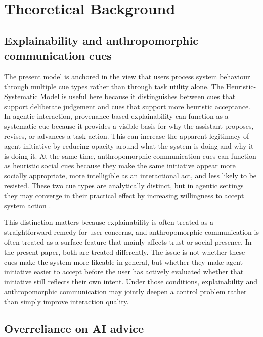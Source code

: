 \documentclass[sigconf,review,anonymous]{acmart}
\begin{document}
\section{Theoretical Background}

\subsection{Explainability and anthropomorphic communication cues}

The present model is anchored in the view that users process system behaviour through multiple cue types rather than through task utility alone. The Heuristic-Systematic Model is useful here because it distinguishes between cues that support deliberate judgement and cues that support more heuristic acceptance. In agentic interaction, provenance-based explainability can function as a systematic cue because it provides a visible basis for why the assistant proposes, revises, or advances a task action. This can increase the apparent legitimacy of agent initiative by reducing opacity around what the system is doing and why it is doing it. At the same time, anthropomorphic communication cues can function as heuristic social cues because they make the same initiative appear more socially appropriate, more intelligible as an interactional act, and less likely to be resisted. These two cue types are analytically distinct, but in agentic settings they may converge in their practical effect by increasing willingness to accept system action \cite{bucinca2021trust,vasconcelos2023explanations,epley2007seeinghuman,go2019humanizing}.

This distinction matters because explainability is often treated as a straightforward remedy for user concerns, and anthropomorphic communication is often treated as a surface feature that mainly affects trust or social presence. In the present paper, both are treated differently. The issue is not whether these cues make the system more likeable in general, but whether they make agent initiative easier to accept before the user has actively evaluated whether that initiative still reflects their own intent. Under those conditions, explainability and anthropomorphic communication may jointly deepen a control problem rather than simply improve interaction quality.

\subsection{Overreliance on AI advice}
\end{document}
